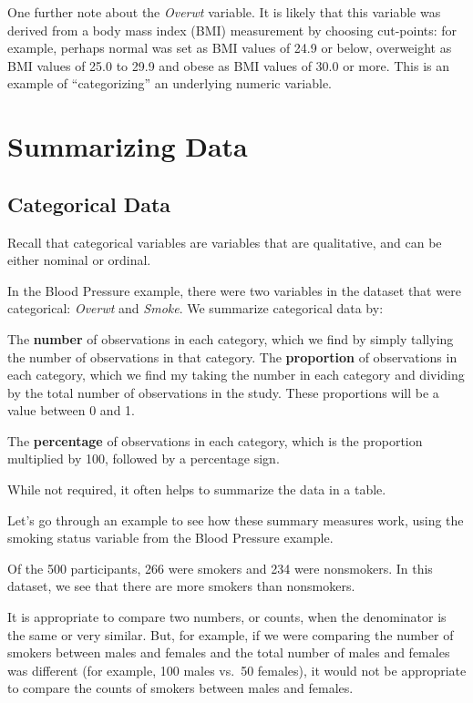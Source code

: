 \documentclass[
]{book}
\begin{document}
One further note about the \emph{Overwt} variable. It is likely that this variable was derived from a body mass index (BMI) measurement by choosing cut-points: for example, perhaps normal was set as BMI values of 24.9 or below, overweight as BMI values of 25.0 to 29.9 and obese as BMI values of 30.0 or more. This is an example of ``categorizing'' an underlying numeric variable.

\hypertarget{summarizing-data}{%
\section{Summarizing Data}\label{summarizing-data}}

\hypertarget{categorical-data}{%
\subsection{Categorical Data}\label{categorical-data}}

Recall that categorical variables are variables that are qualitative, and can be either nominal or ordinal.

In the Blood Pressure example, there were two variables in the dataset that were categorical: \emph{Overwt} and \emph{Smoke}. We summarize categorical data by:

The \textbf{number} of observations in each category, which we find by simply tallying the number of observations in that category.
The \textbf{proportion} of observations in each category, which we find my taking the number in each category and dividing by the total number of observations in the study. These proportions will be a value between 0 and 1.

The \textbf{percentage} of observations in each category, which is the proportion multiplied by 100, followed by a percentage sign.

While not required, it often helps to summarize the data in a table.

Let's go through an example to see how these summary measures work, using the smoking status variable from the Blood Pressure example.

Of the 500 participants, 266 were smokers and 234 were nonsmokers. In this dataset, we see that there are more smokers than nonsmokers.

It is appropriate to compare two numbers, or counts, when the denominator is the same or very similar. But, for example, if we were comparing the number of smokers between males and females and the total number of males and females was different (for example, 100 males vs.~50 females), it would not be appropriate to compare the counts of smokers between males and females.
\end{document}
